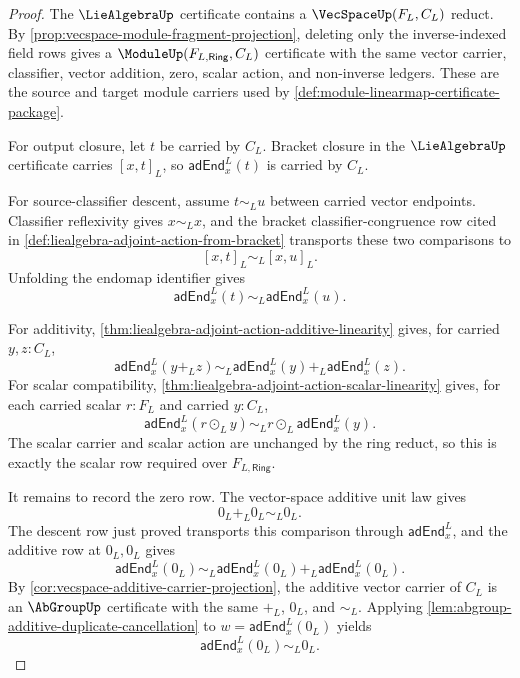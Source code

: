 \begin{proof}
The $\LieAlgebraUp$ certificate contains a $\VecSpaceUp(F_L,C_L)$ reduct. By \autoref{prop:vecspace-module-fragment-projection}, deleting only the inverse-indexed field rows gives a $\ModuleUp(F_{L,\mathsf{Ring}},C_L)$ certificate with the same vector carrier, classifier, vector addition, zero, scalar action, and non-inverse ledgers. These are the source and target module carriers used by \autoref{def:module-linearmap-certificate-package}.

For output closure, let $t$ be carried by $C_L$. Bracket closure in the $\LieAlgebraUp$ certificate carries $[x,t]_L$, so $\mathsf{adEnd}^{L}_{x}(t)$ is carried by $C_L$.

For source-classifier descent, assume $t\sim_Lu$ between carried vector endpoints. Classifier reflexivity gives $x\sim_Lx$, and the bracket classifier-congruence row cited in \autoref{def:liealgebra-adjoint-action-from-bracket} transports these two comparisons to
$$
[x,t]_L\sim_L[x,u]_L.
$$
Unfolding the endomap identifier gives
$$
\mathsf{adEnd}^{L}_{x}(t)\sim_L\mathsf{adEnd}^{L}_{x}(u).
$$

For additivity, \autoref{thm:liealgebra-adjoint-action-additive-linearity} gives, for carried $y,z:C_L$,
$$
\mathsf{adEnd}^{L}_{x}(y+_Lz)
\sim_L
\mathsf{adEnd}^{L}_{x}(y)+_L\mathsf{adEnd}^{L}_{x}(z).
$$
For scalar compatibility, \autoref{thm:liealgebra-adjoint-action-scalar-linearity} gives, for each carried scalar $r:F_L$ and carried $y:C_L$,
$$
\mathsf{adEnd}^{L}_{x}(r\odot_Ly)
\sim_L
r\odot_L\mathsf{adEnd}^{L}_{x}(y).
$$
The scalar carrier and scalar action are unchanged by the ring reduct, so this is exactly the scalar row required over $F_{L,\mathsf{Ring}}$.

It remains to record the zero row. The vector-space additive unit law gives
$$
0_L+_L0_L\sim_L0_L.
$$
The descent row just proved transports this comparison through $\mathsf{adEnd}^{L}_{x}$, and the additive row at $0_L,0_L$ gives
$$
\mathsf{adEnd}^{L}_{x}(0_L)
\sim_L
\mathsf{adEnd}^{L}_{x}(0_L)+_L\mathsf{adEnd}^{L}_{x}(0_L).
$$
By \autoref{cor:vecspace-additive-carrier-projection}, the additive vector carrier of $C_L$ is an $\AbGroupUp$ certificate with the same $+_L$, $0_L$, and $\sim_L$. Applying \autoref{lem:abgroup-additive-duplicate-cancellation} to $w=\mathsf{adEnd}^{L}_{x}(0_L)$ yields
$$
\mathsf{adEnd}^{L}_{x}(0_L)\sim_L0_L.
$$


\end{proof}
